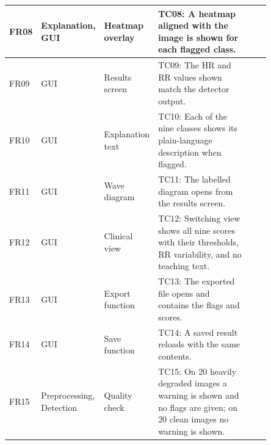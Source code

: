 \documentclass[12pt,nonacm,acmlarge,titlepage,screen]{acmart}
\begin{document}
\begin{table}[!htbp]
\begin{tabular}{|P{0.07\linewidth}|P{0.15\linewidth}|P{0.16\linewidth}|P{0.39\linewidth}|P{0.08\linewidth}|}
    \hline
    FR08 & Explanation, GUI & Heatmap overlay & TC08: A heatmap aligned with the image is shown for each flagged class. & \\
    \hline
    FR09 & GUI & Results screen & TC09: The HR and RR values shown match the detector output. & \\
    \hline
    FR10 & GUI & Explanation text & TC10: Each of the nine classes shows its plain-language description when flagged. & \\
    \hline
    FR11 & GUI & Wave diagram & TC11: The labelled diagram opens from the results screen. & \\
    \hline
    FR12 & GUI & Clinical view & TC12: Switching view shows all nine scores with their thresholds, RR variability, and no teaching text. & \\
    \hline
    FR13 & GUI & Export function & TC13: The exported file opens and contains the flags and scores. & \\
    \hline
    FR14 & GUI & Save function & TC14: A saved result reloads with the same contents. & \\
    \hline
    FR15 & Preprocessing, Detection & Quality check & TC15: On 20 heavily degraded images a warning is shown and no flags are given; on 20 clean images no warning is shown. & \\
    \hline
  \end{tabular}
\end{table}
\end{document}
